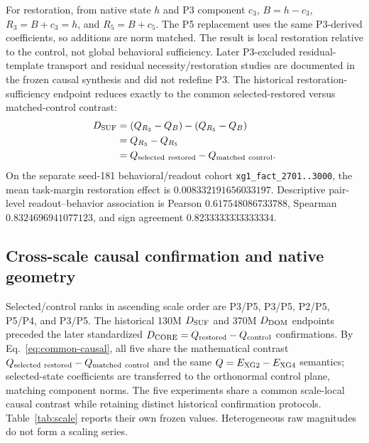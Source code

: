 For restoration, from native state $h$ and P3 component $c_3$,
$B=h-c_3$, $R_3=B+c_3=h$, and $R_5=B+c_5$.
The P5 replacement uses the same P3-derived coefficients, so additions
are norm matched. The result is local restoration relative to the control,
not global behavioral sufficiency. Later P3-excluded residual-template
transport and residual necessity/restoration studies are documented in the
frozen causal synthesis and did not redefine P3.
The historical restoration-sufficiency endpoint reduces exactly to the
common selected-restored versus matched-control contrast:
\begin{equation}
\begin{aligned}
D_{\rm SUF}
&=(Q_{R_3}-Q_B)-(Q_{R_5}-Q_B)\\
&=Q_{R_3}-Q_{R_5}\\
&=Q_{\rm selected\ restored}-Q_{\rm matched\ control}.
\end{aligned}
\label{eq:common-causal}
\end{equation}
On the separate seed-181 behavioral/readout cohort
\texttt{xg1\_fact\_2701..3000}, the mean task-margin restoration
effect is $0.008332191656033197$. Descriptive pair-level
readout--behavior association is Pearson $0.617548086733788$,
Spearman $0.8324696941077123$, and sign agreement $0.8233333333333334$.

\subsection{Cross-scale causal confirmation and native geometry}
\label{app:scale}

Selected/control ranks in ascending scale order are P3/P5, P3/P5, P2/P5,
P5/P4, and P3/P5. The historical 130M $D_{\rm SUF}$ and 370M
$D_{\rm DOM}$ endpoints preceded the later standardized
$D_{\rm CORE}=Q_{\rm restored}-Q_{\rm control}$ confirmations.
By Eq.~\ref{eq:common-causal}, all five share the mathematical contrast
$Q_{\rm selected\ restored}-Q_{\rm matched\ control}$ and the same
$Q=E_{\rm XG2}-E_{\rm XG4}$ semantics; selected-state coefficients are
transferred to the orthonormal control plane, matching component norms.
The five experiments share a common scale-local causal contrast while
retaining distinct historical confirmation protocols.
Table~\ref{tab:scale} reports their own frozen values. Heterogeneous raw
magnitudes do not form a scaling series.

